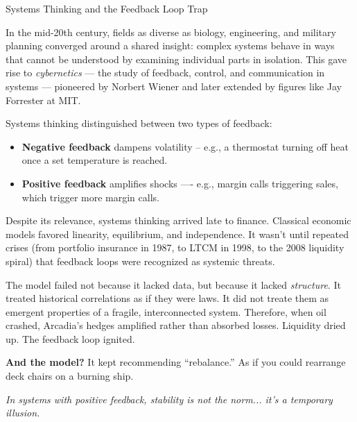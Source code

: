 \medskip

\begin{PhilosophicalSidebar}{Systems Thinking and the Feedback Loop Trap}

  In the mid-20th century, fields as diverse as biology, engineering, and military planning converged 
  around a shared insight: complex systems behave in ways that cannot be understood by examining individual 
  parts in isolation. This gave rise to \textit{cybernetics} — the study of feedback, control, and 
  communication in systems — pioneered by Norbert Wiener and later extended by figures like Jay Forrester 
  at MIT.

  \medskip
  
  Systems thinking distinguished between two types of feedback:  

  \medskip

  \begin{itemize}
    \item \textbf{Negative feedback} dampens volatility -- e.g., a thermostat turning off heat once a set 
    temperature is reached.  
    \item \textbf{Positive feedback} amplifies shocks —- e.g., margin calls triggering sales, which trigger 
    more margin calls.
  \end{itemize}

  \medskip
  
  Despite its relevance, systems thinking arrived late to finance. Classical economic models favored 
  linearity, equilibrium, and independence. It wasn’t until repeated crises (from portfolio insurance in 
  1987, to LTCM in 1998, to the 2008 liquidity spiral) that feedback loops were recognized as systemic threats.

  \medskip
  
  The model failed not because it lacked data, but because it lacked \textit{structure}. It treated 
  historical correlations as if they were laws. It did not treate them as emergent properties of a fragile, 
  interconnected system. Therefore, when oil crashed, Arcadia’s hedges amplified rather than absorbed losses. 
  Liquidity dried up.  The feedback loop ignited.  

  \medskip
  
  \textbf{And the model?}  
  It kept recommending ``rebalance.''
  As if you could rearrange deck chairs on a burning ship.
  
  \medskip

  \begin{center}
  \textit{In systems with positive feedback, stability is not the norm... it’s a temporary illusion.}
  \end{center}
  
\end{PhilosophicalSidebar}

